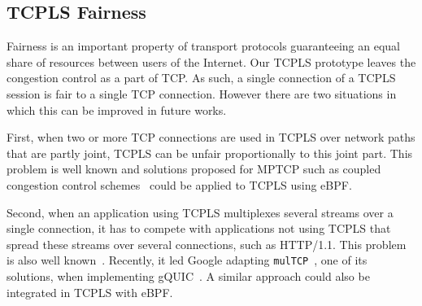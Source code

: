 \subsection{TCPLS Fairness}

Fairness is an important property of transport protocols
guaranteeing an equal share of resources between users of the Internet. Our 
TCPLS prototype leaves the congestion control as a part of TCP. As such, a 
single connection of a TCPLS session is fair to a single TCP connection.
However there are two situations in which this can be improved in future works.

First, when two or more TCP connections are used in TCPLS over network paths 
that are partly joint, TCPLS can be unfair proportionally to this joint part.
This problem is well known and solutions proposed for MPTCP such as coupled 
congestion control 
schemes~\cite{wischik2011design,peng2014multipath,khalili2013mptcp} could be 
applied to TCPLS using eBPF.

Second, when an application using TCPLS multiplexes several streams over a 
single connection, it has to compete with applications not using TCPLS that 
spread these streams over several connections, such as HTTP/1.1. This problem 
is also well known~\cite{min2019experimental}. Recently, it led Google adapting 
\texttt{mulTCP}~\cite{crowcroft1998differentiated}, one of its solutions, when 
implementing gQUIC~\cite{langley2017quic}. A similar approach could also be 
integrated in TCPLS with eBPF.




